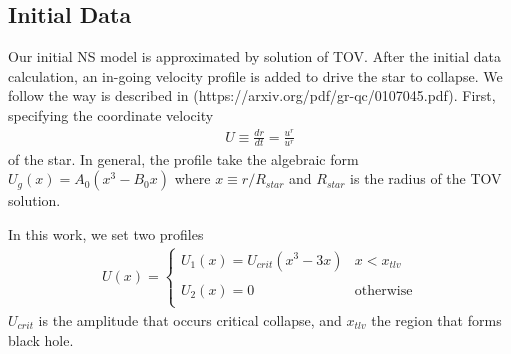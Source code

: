 \documentclass[prd]{revtex4}
\newcommand*\apost{\textsc{\char13}}
\begin{document}




\subsection{Initial Data}
Our initial NS model is approximated by solution of TOV. After the initial data calculation, an in-going velocity profile is added to drive the star to collapse. We follow the way is described in (https://arxiv.org/pdf/gr-qc/0107045.pdf). First, specifying the coordinate velocity
\begin{align}
U \equiv \frac{dr}{dt} = \frac{u^r}{u^r}
\end{align}
of the star. In general, the profile take the algebraic form $U_g(x) = A_0 (x^3 - B_0 x)$ where $x \equiv  r/R_{star}$ and $R_{star}$ is the radius of the TOV solution.

In this work, we set two profiles
\begin{align}
U(x) =
\begin{cases}
U_1(x) = U_{crit} ( x^3 - 3x) & x < x_{tlv} \\
\\
U_2(x) = 0 & \textrm{otherwise} \\
\end{cases}
\end{align}
$U_{crit}$ is the amplitude that occurs critical collapse, and $x_{tlv}$ the region that forms black hole. 
\end{document}
